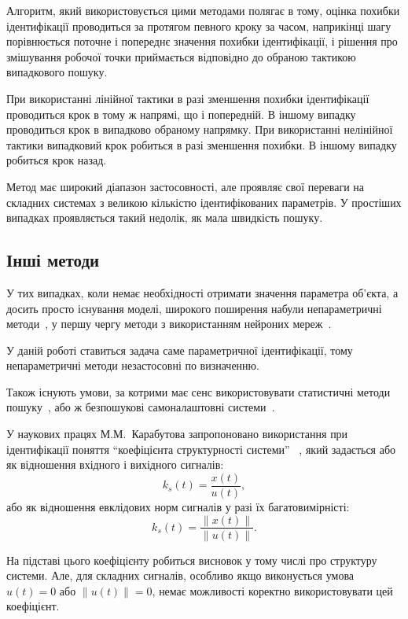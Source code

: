 Алгоритм, який використовується цими методами полягає в тому,
оцінка похибки ідентифікації проводиться за протягом певного
кроку за часом,
наприкінці шагу
порівнюється поточне і попереднє значення похибки
ідентифікації, і рішення про змішування робочої точки
приймається відповідно до обраною тактикою випадкового пошуку.

При використанні лінійної тактики в разі зменшення похибки
ідентифікації проводиться крок в тому ж напрямі, що і
попередній. В іншому випадку проводиться крок в випадково
обраному напрямку. При використанні нелінійної тактики
випадковий крок робиться в разі зменшення похибки. В іншому
випадку робиться крок назад.

Метод має широкий діапазон застосовності, але проявляє
свої переваги на складних системах з великою кількістю
ідентифікованих параметрів. У простіших випадках проявляється
такий недолік, як мала швидкість пошуку.


\subsection{Інші методи} %

У тих випадках, коли немає необхідності отримати значення
параметра об'єкта, а досить просто існування моделі, широкого
поширення набули непараметричні методи~\cite{medved_nepar_alg_id_nds},
у першу чергу методи з використанням нейроних
мереж~\cite{chen_nn_for_nls_mod,chen_nls_id_radial_basis,patra_nds_id_cheb,narendra_id_ctl_ds_nn,bodyan_adapt_viyavl}.

У даній роботі ставиться задача саме параметричної
ідентифікації, тому  непараметричні методи незастосовні по
визначенню.

Також існують умови, за котрими має сенс використовувати
статистичні методи пошуку~\cite{rastr_stat_meth_search},
або ж
безпошукові самоналаштовні системи~\cite{kozlov_nosearch_sns}.


У наукових працях М.М.~Карабутова
запропоновано використання при ідентифікації
поняття ``коефіцієнта структурності системи''
~\cite{karabutov_adapt_id_sys,saliga_id_ctl_black},
який задається або як відношення
вхідного і вихідного сигналів:
%
\[
  k_s(t) = \frac{x(t)}{u(t)},
\]
%
або як відношення евклідових норм сигналів у разі їх багатовимірністі:
%
\[
  k_s(t) = \frac{\|x(t)\|}{\|u(t)\|}.
\]

На підставі цього коефіцієнту робиться висновок у тому числі
про структуру системи.
Але, для складних сигналів, особливо якщо виконується умова
$u(t)=0$ або $\|u(t)\| = 0$,
немає можливості коректно використовувати цей коефіцієнт.


